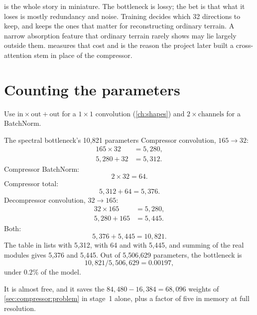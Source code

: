  is the whole story in miniature. The bottleneck is lossy; the bet is that
what it loses is mostly redundancy and noise. Training decides which 32 directions to keep, and keeps
the ones that matter for reconstructing ordinary terrain. A narrow absorption feature that ordinary
terrain rarely shows may lie largely outside them.  measures that cost and is the
reason the project later built a cross-attention stem in place of the compressor.

\section{Counting the parameters}\label{sec:compressor:count}

Use $\text{in}\times\text{out}+\text{out}$ for a $1\times1$ convolution (\cref{ch:shapes}) and
$2\times\text{channels}$ for a BatchNorm.

\begin{worked}[label={we:compressor:count}]{The spectral bottleneck's 10,821 parameters}
Compressor convolution, $165\to32$:
\begin{align*}
165\times32 &= 5{,}280,\\
5{,}280 + 32 &= 5{,}312.
\end{align*}
Compressor BatchNorm:
\[
2\times32 = 64.
\]
Compressor total:
\[
5{,}312 + 64 = 5{,}376.
\]
Decompressor convolution, $32\to165$:
\begin{align*}
32\times165 &= 5{,}280,\\
5{,}280 + 165 &= 5{,}445.
\end{align*}
Both:
\[
5{,}376 + 5{,}445 = 10{,}821.
\]
The  table in  lists
 with 5{,}312,  with 64 and  with
5{,}445, and summing
 of the real modules gives 5{,}376 and 5{,}445\tagC. Out of 5{,}506{,}629
parameters, the bottleneck is
\[
10{,}821 / 5{,}506{,}629 = 0.00197,
\]
under $0.2\%$ of the model.
\end{worked}

It is almost free, and it saves the $84{,}480 - 16{,}384 = 68{,}096$ weights of
\cref{sec:compressor:problem} in stage~1 alone, plus a factor of five in memory at full resolution.

